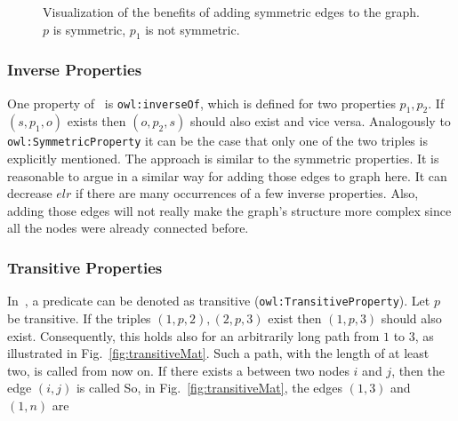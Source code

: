 \begin{figure}[h]
	\centering
	\hfill
	\caption{Visualization of the benefits of adding symmetric edges to the graph. $p$ is symmetric, $p_1$ is not symmetric.}
	\label{}
\end{figure}

\subsubsection{Inverse Properties}\label{sec:approachInverse}

One property of~\cite{owl} is {\tt owl:inverseOf}, which is defined for two properties $p_1, p_2$. If $(s,p_1,o)$ exists then $(o,p_2,s)$ should also exist and vice versa. Analogously to {\tt owl:SymmetricProperty} it can be the case that only one of the two triples is explicitly mentioned. The approach is similar to the symmetric properties. It is reasonable to argue in a similar way for adding those edges to graph here. It can decrease $elr$ if there are many occurrences of a few inverse properties. Also, adding those edges will not really make the graph's structure more complex since all the nodes were already connected before. 


\subsubsection{Transitive Properties}\label{sec:approachTransitive}


In~\cite{owl}, a predicate can be denoted as transitive ({\tt owl:TransitiveProperty}). Let $p$ be transitive. If the triples $(1,p,2),(2,p,3)$ exist then $(1,p,3)$ should also exist. Consequently, this holds also for an arbitrarily long path from $1$ to $3$, as illustrated in Fig.~\ref{fig:transitiveMat}. Such a path, with the length of at least two, is called \tp from now on. If there exists a \tp between two nodes $i$ and $j$, then the edge $(i,j)$ is called \dtpp So, in Fig.~\ref{fig:transitiveMat}, the edges $(1,3)$ and $(1,n)$ are \dtpsp

